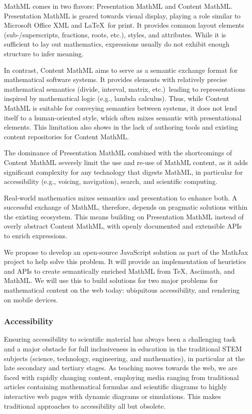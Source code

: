 \documentclass[12pt]{amsart}
\begin{document}
MathML comes in two flavors: Presentation MathML and 
Content MathML. Presentation MathML is geared towards visual display, playing a 
role similar to Microsoft Office XML and \LaTeX\ for print. It provides common 
layout elements (sub-/superscripts, fractions, roots, etc.), styles, and 
attributes. While it is sufficient to lay out mathematics, expressions usually 
do not exhibit enough structure to infer meaning.

In contrast, Content MathML aims to serve as a semantic exchange format for 
mathematical software systems. It provides elements with relatively precise 
mathematical semantics (divide, interval, matrix, etc.)~leading to 
representations inspired by mathematical logic (e.g., lambda 
calculus). Thus, while Content MathML is suitable for conveying semantics 
between systems, it does not lend itself to a human-oriented style, which often 
mixes semantic with presentational elements. This limitation also shows in the 
lack of authoring tools and existing content repositories for Content MathML.

The dominance of Presentation MathML combined with the shortcomings of Content 
MathML severely limit the use and re-use of MathML content, as it adds 
significant complexity for any  technology that digests MathML, in particular for
accessibility (e.g., voicing, navigation), search, and scientific computing. 

Real-world mathematics mixes semantics and presentation to enhance both. A 
successful exchange of MathML, therefore, depends on pragmatic solutions within the 
existing ecosystem. This means building on Presentation MathML instead of 
overly abstract Content MathML, with openly documented and extensible APIs to 
enrich expressions.

We propose to develop an open-source JavaScript solution as part of the MathJax 
project to help solve this problem. It will provide an implementation of 
heuristics and APIs to create semantically enriched MathML from \TeX, Asciimath, 
and MathML. We will use this to build solutions for two major problems for 
mathematical content on the web today: ubiquitous accessibility, and rendering 
on mobile devices.


\subsubsection*{Accessibility}

Ensuring accessibility to scientific material has always been a challenging 
task and a major obstacle for full inclusiveness in education in the 
traditional STEM subjects (science, technology, engineering, and mathematics), 
in particular at the late secondary and tertiary stages. As teaching moves 
towards the web, we are faced with rapidly changing content, employing media 
ranging from traditional articles containing mathematical formulas and 
scientific diagrams to highly interactive web pages with dynamic diagrams or 
simulations.  This makes traditional approaches to accessibility all but obsolete. 
\end{document}
